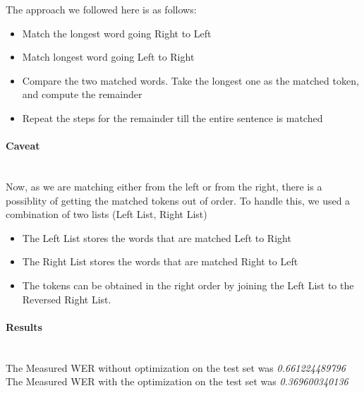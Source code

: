 \documentclass{article}
\begin{document}
The approach we followed here is as follows:
\begin{itemize}
\item Match the longest word going Right to Left
\item Match longest word going Left to Right
\item Compare the two matched words. Take the longest one as the matched token, and compute the remainder
\item Repeat the steps for the remainder till the entire sentence is matched
\end{itemize}

\paragraph{Caveat} \hspace{0pt} \\
\normalsize Now, as we are matching either from the left or from the right, there is a possiblity of getting the matched tokens out of order. To handle this, we used a combination of two lists (Left List, Right List)
\begin{itemize}
\item The Left List stores the words that are matched Left to Right
\item The Right List stores the words that are matched Right to Left
\item The tokens can be obtained in the right order by joining the Left List to the Reversed Right List.
\end{itemize}

\paragraph{Results} \hspace{0pt} \\
The Measured WER without optimization on the test set was \textit{0.661224489796} \\
The Measured WER with the optimization on the test set was \textit{0.369600340136}
\end{document}
